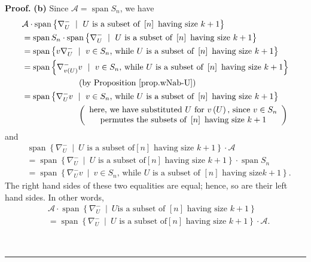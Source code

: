 \documentclass[numbers=enddot,12pt,final,onecolumn,notitlepage]{scrartcl}%
\numberwithin{exer}{subsection}
\theoremstyle{definition}
\newenvironment{proof}[1][Proof]{\noindent\textbf{#1.} }{\ \rule{0.5em}{0.5em}}
\begin{document}
\begin{proof}
\textbf{(b)} Since $\mathcal{A}=\operatorname*{span}S_{n}$, we have%
\begin{align*}
&  \mathcal{A}\cdot\operatorname*{span}\left\{  \nabla_{U}^{-}\ \mid\ U\text{
is a subset of }\left[  n\right]  \text{ having size }k+1\right\} \\
&  =\operatorname*{span}S_{n}\cdot\operatorname*{span}\left\{  \nabla_{U}%
^{-}\ \mid\ U\text{ is a subset of }\left[  n\right]  \text{ having size
}k+1\right\} \\
&  =\operatorname*{span}\left\{  v\nabla_{U}^{-}\ \mid\ v\in S_{n}\text{,
while }U\text{ is a subset of }\left[  n\right]  \text{ having size
}k+1\right\} \\
&  =\operatorname*{span}\left\{  \nabla_{v\left(  U\right)  }^{-}v\ \mid\ v\in
S_{n}\text{, while }U\text{ is a subset of }\left[  n\right]  \text{ having
size }k+1\right\} \\
&  \ \ \ \ \ \ \ \ \ \ \ \ \ \ \ \ \ \ \ \ \left(  \text{by Proposition
\ref{prop.wNab-U}}\right) \\
&  =\operatorname*{span}\left\{  \nabla_{U}^{-}v\ \mid\ v\in S_{n}\text{,
while }U\text{ is a subset of }\left[  n\right]  \text{ having size
}k+1\right\} \\
&  \ \ \ \ \ \ \ \ \ \ \ \ \ \ \ \ \ \ \ \ \left(
\begin{array}
[c]{c}%
\text{here, we have substituted }U\text{ for }v\left(  U\right)  \text{, since
}v\in S_{n}\\
\text{permutes the subsets of }\left[  n\right]  \text{ having size }k+1
\end{array}
\right)
\end{align*}
and
\begin{align*}
&  \operatorname*{span}\left\{  \nabla_{U}^{-}\ \mid\ U\text{ is a subset of
}\left[  n\right]  \text{ having size }k+1\right\}  \cdot\mathcal{A}\\
&  =\operatorname*{span}\left\{  \nabla_{U}^{-}\ \mid\ U\text{ is a subset of
}\left[  n\right]  \text{ having size }k+1\right\}  \cdot\operatorname*{span}%
S_{n}\\
&  =\operatorname*{span}\left\{  \nabla_{U}^{-}v\ \mid\ v\in S_{n}\text{,
while }U\text{ is a subset of }\left[  n\right]  \text{ having size
}k+1\right\}  .
\end{align*}
The right hand sides of these two equalities are equal; hence, so are their
left hand sides. In other words,%
\begin{align*}
&  \mathcal{A}\cdot\operatorname*{span}\left\{  \nabla_{U}^{-}\ \mid\ U\text{
is a subset of }\left[  n\right]  \text{ having size }k+1\right\} \\
&  =\operatorname*{span}\left\{  \nabla_{U}^{-}\ \mid\ U\text{ is a subset of
}\left[  n\right]  \text{ having size }k+1\right\}  \cdot\mathcal{A}.
\end{align*}



\end{proof}
\end{document}
